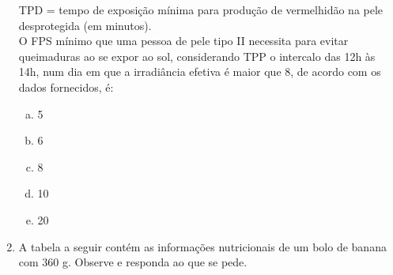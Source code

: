 \documentclass[a4paper,14pt]{article}
\begin{document}
\begin{multicols}{2}
\begin{enumerate}
			TPD = tempo de exposição mínima para produção de vermelhidão na pele desprotegida (em minutos). \\
			O FPS mínimo que uma pessoa de pele tipo II necessita para evitar queimaduras ao se expor ao sol, considerando TPP o intercalo das 12h às 14h, num dia em que a irradiância efetiva é maior que 8, de acordo com os dados fornecidos, é: 
			\begin{enumerate}[a)]
				\item 5
				\item 6
				\item 8
				\item 10
				\item 20
			\end{enumerate}
			\item A tabela a seguir contém as informações nutricionais de um bolo de banana com 360 g. Observe e responda ao que se pede. \\\\
			

\end{enumerate}
\end{multicols}
\end{document}
